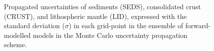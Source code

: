 \begin{figure}
    \begin{adjustbox}{center}
    \end{adjustbox}
    \caption[Propagated uncertainties: maps of standard deviation in each node for sediments, crust, and lithospheric mantle.]{Propagated uncertainties of sediments (SEDS), consolidated crust (CRUST), and lithospheric mantle (LID), expressed with the standard deviation ($\sigma$) in each grid-point in the ensemble of forward-modelled models in the Monte Carlo uncertainty propagation scheme.}
    \label{fig:SigIs:Res:UncertaintyMaps}
\end{figure}

